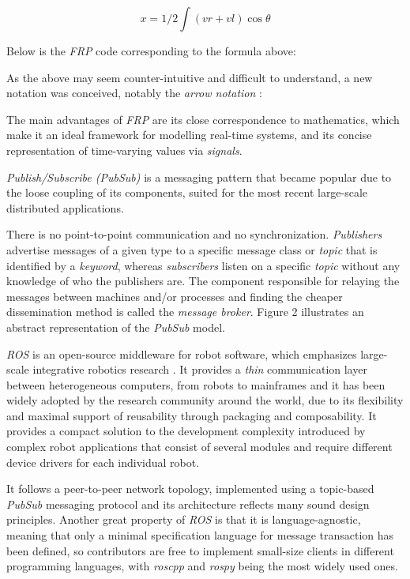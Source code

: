 \documentclass{dithesis}
\begin{document}
$$ x = 1/2 \int (vr + vl) \cos\theta $$ 

Below is the \textit{FRP} code corresponding to the formula above:


As the above may seem counter-intuitive and difficult to understand, a new notation was conceived, notably the \textit{arrow notation} \cite{arrows_notation}:


The main advantages of \textit{FRP} are its close correspondence to mathematics\cite{survey_frp}, which make it an ideal framework for modelling real-time systems, and its concise representation of time-varying values via \textit{signals}.


\textit{Publish/Subscribe (PubSub)} is a messaging pattern that became popular due to the loose coupling of its components, suited for the most recent large-scale distributed applications.

There is no point-to-point communication and no synchronization. \textit{Publishers} advertise messages of a given type to a specific message class or \textit{topic} that is identified by a \textit{keyword}, whereas \textit{subscribers} listen on a specific \textit{topic} without any knowledge of who the publishers are. The component responsible for relaying the messages between machines and/or processes and finding the cheaper dissemination method is called the \textit{message broker}. Figure 2 illustrates an abstract representation of the \textit{PubSub} model.



\textit{ROS} is an open-source middleware for robot software, which emphasizes large-scale integrative robotics research \cite{ROS}. It provides a \textit{thin} communication layer between heterogeneous computers, from robots to mainframes and it has been widely adopted by the research community around the world, due to its flexibility and maximal support of reusability through packaging and composability. It provides a compact solution to the development complexity introduced by complex robot applications that consist of several modules and require different device drivers for each individual robot. 

It follows a peer-to-peer network topology, implemented using a topic-based \textit{PubSub} messaging protocol and its architecture reflects many sound design principles. Another great property of \textit{ROS} is that it is language-agnostic, meaning that only a minimal specification language for message transaction has been defined, so contributors are free to implement small-size clients in different programming languages, with \textit{roscpp} and \textit{rospy} being the most widely used ones.
\end{document}
